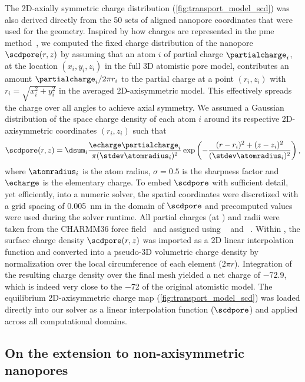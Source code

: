 The 2D-axially symmetric charge distribution (\cref{fig:transport_model_scd}) was also derived directly from
the 50 sets of aligned nanopore coordinates that were used for the geometry. Inspired by how charges are
represented in the \gls{pme} method~\cite{Aksimentiev-2005}, we computed the fixed charge distribution of the
nanopore $\scdpore(r,z)$ by assuming that an atom $i$ of partial charge $\partialcharge_{i}$, at the location
$(x_i, y_i, z_i)$ in the full 3D atomistic pore model, contributes an amount $\partialcharge_{i}/2\pi r_i$ to
the partial charge at a point $(r_i,z_i)$ with $r_i = \sqrt{x_i^2 + y_i^2}$ in the averaged 2D-axisymmetric
model. This effectively spreads the charge over all angles to achieve axial symmetry. We assumed a Gaussian
distribution of the space charge density of each atom $i$ around its respective 2D-axisymmetric coordinates
$(r_i,z_i)$ such that
%
\begin{align}
\label{eq:scdpore}
  \scdpore(r,z) = \dsum_{i} \dfrac{\echarge\partialcharge_{i}}{\pi(\stdev\atomradius_{i})^2}
            \exp{\left(-\dfrac{(r-r_i)^2 + (z-z_i)^2}{(\stdev\atomradius_{i})^2}\right)}
  \text{\,,}
\end{align}
%
where $\atomradius_{i}$ is the atom radius, $\sigma = 0.5$ is the sharpness factor and $\echarge$ is the
elementary charge. To embed $\scdpore$ with sufficient detail, yet efficiently, into a numeric solver, the
spatial coordinates were discretized with a grid spacing of \SI{0.005}{\nm} in the domain of $\scdpore$ and
precomputed values were used during the solver runtime. All partial charges (at ) and radii were taken
from the CHARMM36 force field~\cite{Best-2012} and assigned using ~\cite{Olsson-2011} and
~\cite{Jurrus-2018}. Within , the surface charge density $\scdpore(r,z)$ was
imported as a 2D linear interpolation function and converted into a pseudo-3D volumetric charge density by
normalization over the local circumference of each element ($2 \pi r$). Integration of the resulting charge
density over the final mesh yielded a net charge of \SI{-72.9}{\ec}, which is indeed very close to the
\SI{-72}{\ec} of the original atomistic model. The equilibrium 2D-axisymmetric charge map
(\cref{fig:transport_model_scd}) was loaded directly into our solver as a linear interpolation function
($\scdpore$) and applied across all computational domains.



\subsection{On the extension to non-axisymmetric nanopores}
%

